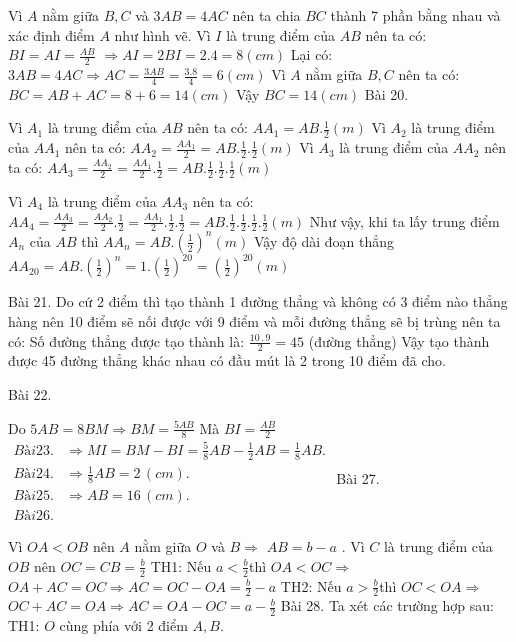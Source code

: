 Vì $A$ nằm giữa $B,C$ và $3AB=4AC$ nên ta chia $BC$ thành 7 phần bằng nhau và xác định điểm $A$ như hình vẽ.
Vì $I$ là trung điểm của $AB$ nên ta có: $BI=AI=\frac{AB}{2}$
$\Rightarrow AI=2BI=2.4=8\left( cm \right)$
Lại có: $3AB=4AC\Rightarrow AC=\frac{3AB}{4}=\frac{3.8}{4}=6\left( cm \right)$
Vì $A$ nằm giữa $B,C$ nên ta có: $BC=AB+AC=8+6=14\left( cm \right)$
Vậy $BC=14\left( cm \right)$
Bài 20. 


Vì ${{A}_{1}}$ là trung điểm của $AB$ nên ta có: $A{{A}_{1}}=AB.\frac{1}{2}\left( m \right)$
Vì ${{A}_{2}}$ là trung điểm của $A{{A}_{1}}$ nên ta có: $A{{A}_{2}}=\frac{A{{A}_{1}}}{2}=AB.\frac{1}{2}.\frac{1}{2}\left( m \right)$
Vì ${{A}_{3}}$ là trung điểm của $A{{A}_{2}}$ nên ta có: $A{{A}_{3}}=\frac{A{{A}_{2}}}{2}=\frac{A{{A}_{1}}}{2}.\frac{1}{2}=AB.\frac{1}{2}.\frac{1}{2}.\frac{1}{2}\left( m \right)$

Vì ${{A}_{4}}$ là trung điểm của $A{{A}_{3}}$ nên ta có: $A{{A}_{4}}=\frac{A{{A}_{3}}}{2}=\frac{A{{A}_{2}}}{2}.\frac{1}{2}=\frac{A{{A}_{1}}}{2}.\frac{1}{2}.\frac{1}{2}=AB.\frac{1}{2}.\frac{1}{2}.\frac{1}{2}.\frac{1}{2}\left( m \right)$
Như vậy, khi ta lấy trung điểm ${{A}_{n}}$ của $AB$ thì $A{{A}_{n}}=AB.{{\left( \frac{1}{2} \right)}^{n}}\left( m \right)$
Vậy độ dài đoạn thẳng $A{{A}_{20}}=AB.{{\left( \frac{1}{2} \right)}^{n}}=1.{{\left( \frac{1}{2} \right)}^{20}}={{\left( \frac{1}{2} \right)}^{20}}\left( m \right)$

Bài 21. Do cứ 2 điểm thì tạo thành 1 đường thẳng và không có 3 điểm nào thẳng hàng nên 10 điểm sẽ nối được với 9 điểm và mỗi đường thẳng sẽ bị trùng nên ta có: 
Số đường thẳng được tạo thành là:  $\frac{10\,.\,9}{2}=45$  (đường thẳng)
Vậy tạo thành được 45 đường thẳng khác nhau có đầu mút là 2 trong 10 điểm đã cho.

Bài 22. 

Do  $5AB=8BM\Rightarrow BM=\frac{5AB}{8}$ 
Mà  $BI=\frac{AB}{2}$ 
 $\begin{align}
	Bài 23.   & \Rightarrow MI=BM-BI=\frac{5}{8}AB-\frac{1}{2}AB=\frac{1}{8}AB. \\ 
	Bài 24.  & \Rightarrow \frac{1}{8}AB=2\,(cm). \\ 
	Bài 25.  & \Rightarrow AB=16\,(cm). \\ 
	Bài 26. \end{align}$ 
Bài 27. 

Vì $OA<OB$ nên $A$ nằm giữa $O$ và $B$$\Rightarrow $ $AB=b-a$ .
Vì $C$ là trung điểm của $OB$ nên $OC=CB=\frac{b}{2}$
TH1: Nếu $a<\frac{b}{2}$thì $OA<OC\Rightarrow $$OA+AC=OC\Rightarrow AC=OC-OA=\frac{b}{2}-a$
TH2: Nếu $a>\frac{b}{2}$thì $OC<OA\Rightarrow $$OC+AC=OA\Rightarrow AC=OA-OC=a-\frac{b}{2}$
Bài 28. Ta xét các trường hợp sau:
TH1:  $O$ cùng phía với 2 điểm $A,B.$ 

